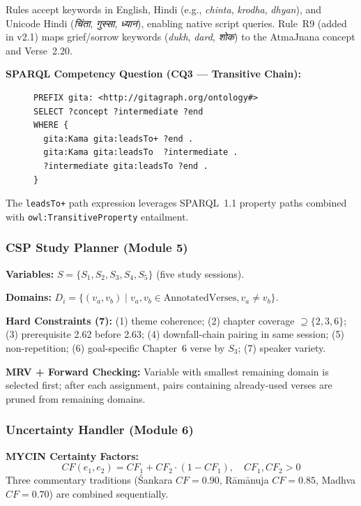 \documentclass[conference]{IEEEtran}
\newcommand{\dv}[1]{{\devfont #1}}
\begin{document}
Rules accept keywords in English, Hindi (e.g., \textit{chinta}, \textit{krodha},
\textit{dhyan}), and Unicode Hindi (\textit{\dv{चिंता}}, \textit{\dv{गुस्सा}},
\textit{\dv{ध्यान}}), enabling native script queries. Rule~R9 (added in v2.1)
maps grief/sorrow keywords (\textit{dukh}, \textit{dard}, \textit{\dv{शोक}}) to
the AtmaJnana concept and Verse~2.20.

\textbf{SPARQL Competency Question (CQ3 — Transitive Chain):}

\begin{figure}[tbp]
\begin{lstlisting}[language=SPARQL, caption={CQ3: Desire downfall chain via transitivity}, label={lst:sparql}]
PREFIX gita: <http://gitagraph.org/ontology#>
SELECT ?concept ?intermediate ?end
WHERE {
  gita:Kama gita:leadsTo+ ?end .
  gita:Kama gita:leadsTo  ?intermediate .
  ?intermediate gita:leadsTo ?end .
}
\end{lstlisting}
\end{figure}
The \texttt{leadsTo+} path expression leverages SPARQL~1.1 property paths
combined with \texttt{owl:TransitiveProperty} entailment.

\subsubsection{CSP Study Planner (Module 5)}

\textbf{Variables:} $S = \{S_1, S_2, S_3, S_4, S_5\}$ (five study sessions).

\textbf{Domains:} $D_i = \{(v_a, v_b) \mid v_a, v_b \in \text{AnnotatedVerses}, v_a \neq v_b\}$.

\textbf{Hard Constraints (7):} (1) theme coherence; (2) chapter coverage
$\supseteq \{2,3,6\}$; (3) prerequisite 2.62 before 2.63;
(4) downfall-chain pairing in same session; (5) non-repetition;
(6) goal-specific Chapter~6 verse by $S_3$; (7) speaker variety.

\textbf{MRV + Forward Checking:} Variable with smallest remaining domain
is selected first; after each assignment, pairs containing already-used
verses are pruned from remaining domains.

\subsubsection{Uncertainty Handler (Module 6)}

\textbf{MYCIN Certainty Factors:}
\begin{equation}
  CF(e_1, e_2) = CF_1 + CF_2 \cdot (1 - CF_1), \quad CF_1, CF_2 > 0
  \label{eq:mycin}
\end{equation}
Three commentary traditions (\'Sankara $CF = 0.90$, R\={a}m\={a}nuja
$CF = 0.85$, Madhva $CF = 0.70$) are combined sequentially.
\end{document}
